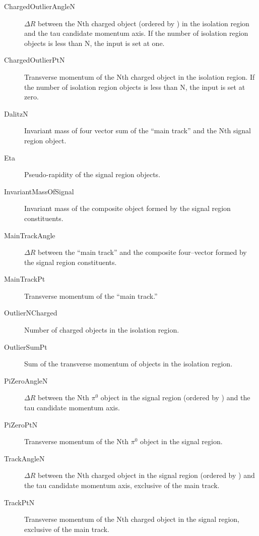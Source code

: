 \begin{description}
  \item[ChargedOutlierAngleN] 
  $\Delta R$ between the Nth charged object (ordered by \pt) in the isolation region
    and the tau candidate momentum axis. If the number of
    isolation region objects is less than N, the input is set at one.

  \item[ChargedOutlierPtN] 
  Transverse momentum of the Nth charged object in the isolation region.  If the number of
    isolation region objects is less than N, the input is set at zero.

  \item[DalitzN] 
   Invariant mass of four vector sum of the ``main track'' and the Nth signal
    region object. 

  \item[Eta] 
  Pseudo-rapidity of the signal region objects. 

  \item[InvariantMassOfSignal] 
  Invariant mass of the composite object formed by the signal region constituents.

  \item[MainTrackAngle] 
  $\Delta R$ between the ``main track'' and the composite four--vector formed by the 
    signal region constituents.

  \item[MainTrackPt] 
  Transverse momentum of the ``main track.'' 

  \item[OutlierNCharged] 
  Number of charged objects in the isolation region.

  \item[OutlierSumPt] 
  Sum of the transverse momentum of objects in the isolation region.

  \item[PiZeroAngleN] 
  $\Delta R$ between the Nth $\pi^0$ object in the signal region (ordered by \pt) and
    the tau candidate momentum axis.

  \item[PiZeroPtN] 
  Transverse momentum of the Nth $\pi^0$ object in the signal region.

  \item[TrackAngleN] 
  $\Delta R$ between the Nth charged object in the signal region (ordered by \pt) and
    the tau candidate momentum axis, exclusive of the main track.

  \item[TrackPtN] 
  Transverse momentum of the Nth charged object in the signal region, exclusive of the 
    main track.

\end{description}
    
